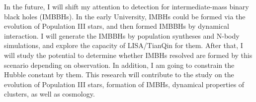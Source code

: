 \documentclass[12pt,a4paper,sans]{article}%
\begin{document}

In the future, I will shift my attention to detection for intermediate-mass binary black holes (IMBBHs). In the early
University, IMBHs could be formed via the evolution of Population III stars, and then formed IMBBHs by
dynamical interaction. I will generate the IMBBHs by population syntheses and N-body simulations, and explore the
capacity of LISA/TianQin for them. After that, I will study the potential to determine whether IMBHs resolved are formed
by this scenario depending on observation. In addition, I am going to constrain the Hubble constant by them. This research will
contribute to the study on the evolution of Population III stars, formation of IMBHs, dynamical properties of clusters, as well as cosmology.
\end{document}
